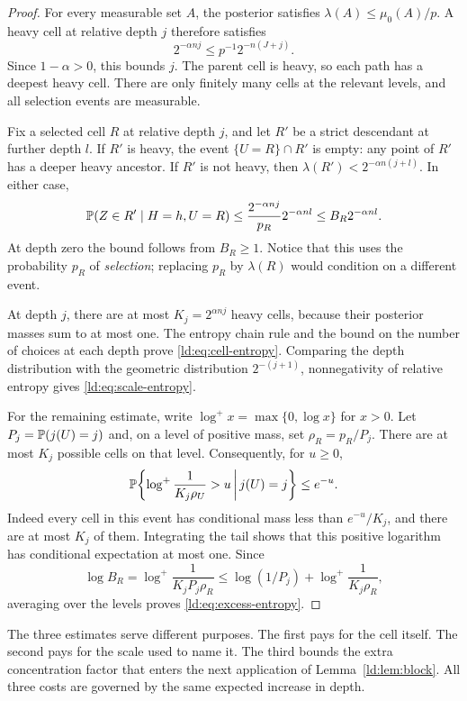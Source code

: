 \begin{proof}
For every measurable set $A$, the posterior satisfies
$\lambda(A)\le\mu_0(A)/p$. A heavy cell at relative depth $j$
therefore satisfies
\[
 2^{-\alpha nj}\le p^{-1}2^{-n(J+j)}.
\]
Since $1-\alpha>0$, this bounds $j$. The parent cell is heavy, so
each path has a deepest heavy cell. There are only finitely many cells
at the relevant levels, and all selection events are measurable.

Fix a selected cell $R$ at relative depth $j$, and let $R'$ be a
strict descendant at further depth $l$. If $R'$ is heavy, the event
$\{U=R\}\cap R'$ is empty: any point of $R'$ has a deeper heavy
ancestor. If $R'$ is not heavy, then
$\lambda(R')<2^{-\alpha n(j+l)}$. In either case,
\[
 \mathbb P(Z\in R'\mid H=h,U=R)
 \le\frac{2^{-\alpha nj}}{p_R}2^{-\alpha nl}
 \le B_R2^{-\alpha nl}.
\]
At depth zero the bound follows from $B_R\ge1$. Notice that this
uses the probability $p_R$ of \emph{selection}; replacing $p_R$ by
$\lambda(R)$ would condition on a different event.

At depth $j$, there are at most $K_j=2^{\alpha nj}$ heavy cells,
because their posterior masses sum to at most one. The entropy chain
rule and the bound on the number of choices at each depth prove
\eqref{ld:eq:cell-entropy}. Comparing the depth distribution with the
geometric distribution $2^{-(j+1)}$, nonnegativity of relative entropy
gives \eqref{ld:eq:scale-entropy}.

For the remaining estimate, write $\log^+x=\max\{0,\log x\}$ for
$x>0$. Let $P_j=\mathbb P(j(U)=j)$ and, on a level
of positive mass, set $\rho_R=p_R/P_j$. There are at most $K_j$
possible cells on that level. Consequently, for $u\ge0$,
\[
 \mathbb P\!\left\{\log^+\frac1{K_j\rho_U}>u\,\middle|\,j(U)=j\right\}
 \le e^{-u}.
\]
Indeed every cell in this event has conditional mass less than
$e^{-u}/K_j$, and there are at most $K_j$ of them. Integrating the
tail shows that this positive logarithm has conditional expectation at
most one. Since
\[
 \log B_R
 =\log^+\frac1{K_jP_j\rho_R}
 \le\log(1/P_j)+\log^+\frac1{K_j\rho_R},
\]
averaging over the levels proves \eqref{ld:eq:excess-entropy}.
\end{proof}

The three estimates serve different purposes. The first pays for the
cell itself. The second pays for the scale used to name it. The third
bounds the extra concentration factor that enters the next application
of Lemma~\ref{ld:lem:block}. All three costs are governed by the same
expected increase in depth.

